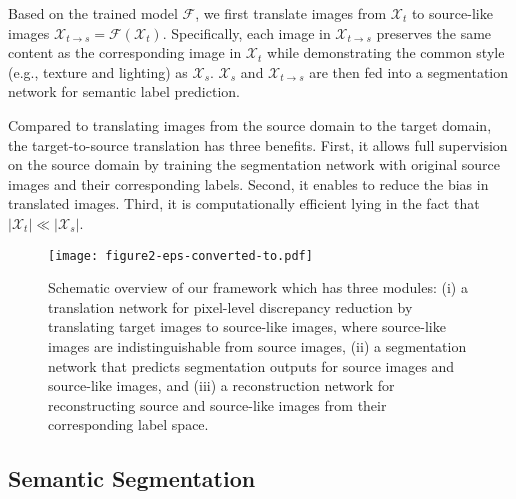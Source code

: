 \documentclass[runningheads]{llncs}
\begin{document}
	
	Based on the trained model $ \mathcal{F} $, we first translate images from $ \mathcal{X}_t $ to source-like images $ \mathcal{X}_{t{\rightarrow}s} = \mathcal{F}(\mathcal{X}_t) $. Specifically, each image in $ \mathcal{X}_{t{\rightarrow}s} $ preserves the same content as the corresponding image in $ \mathcal{X}_t $ while demonstrating the common style (e.g., texture and lighting) as $ \mathcal{X}_s $. $ \mathcal{X}_s $ and $ \mathcal{X}_{t{\rightarrow}s} $ are then fed into a segmentation network for semantic label prediction.
	
	Compared to translating images from the source domain to the target domain, the target-to-source translation has three benefits. First, it allows full supervision on the source domain by training the segmentation network with original source images and their corresponding labels. Second, it enables to reduce the bias in translated images. Third, it is computationally efficient lying in the fact that $ |\mathcal{X}_t| \ll |\mathcal{X}_s| $.
	
	








	\begin{figure*}[t]
\begin{center}
\texttt{[image: figure2-eps-converted-to.pdf]}
		\end{center}
		\caption{Schematic overview of our framework which has three modules: (i) a translation network for pixel-level discrepancy reduction by translating target images to source-like images, where source-like images are indistinguishable from source images, (ii) a segmentation network that predicts segmentation outputs for source images and source-like images, and (iii) a reconstruction network for reconstructing source and source-like images from their corresponding label space.}
		\label{fig:framework}
\end{figure*}
	
	\subsection{Semantic Segmentation}
	
\end{document}
